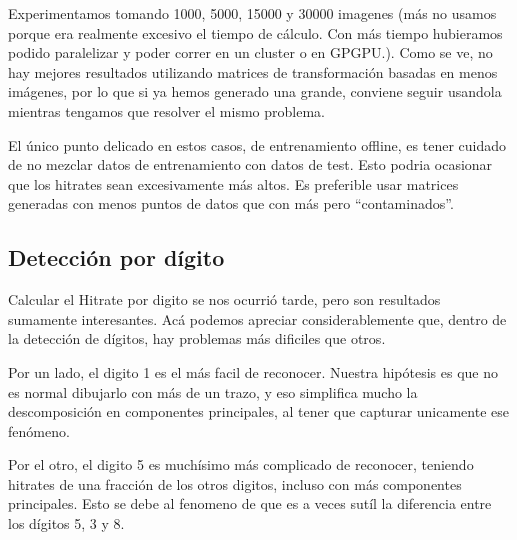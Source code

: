 Experimentamos tomando 1000, 5000, 15000 y 30000 imagenes (m\'as no usamos porque era
realmente excesivo el tiempo de c\'alculo. Con m\'as tiempo hubieramos podido paralelizar
y poder correr en un cluster o en GPGPU.). Como se ve, no hay mejores resultados
utilizando matrices de transformaci\'on basadas en menos im\'agenes, por lo que
si ya hemos generado una grande, conviene seguir usandola mientras tengamos que resolver
el mismo problema.

El \'unico punto delicado en estos casos, de entrenamiento offline, es tener cuidado
de no mezclar datos de entrenamiento con datos de test. Esto podria ocasionar que
los hitrates sean excesivamente m\'as altos. Es preferible usar matrices generadas
con menos puntos de datos que con m\'as pero ``contaminados''.



\subsection{Detecci\'on por d\'igito}
Calcular el Hitrate por digito se nos ocurri\'o tarde, pero son resultados
sumamente interesantes. Ac\'a podemos apreciar considerablemente que, dentro de
la detecci\'on de d\'igitos, hay problemas m\'as dificiles que otros.

Por un lado, el digito 1 es el m\'as facil de reconocer. Nuestra hip\'otesis
es que no es normal dibujarlo con m\'as de un trazo, y eso simplifica mucho la
descomposici\'on en componentes principales, al tener que capturar unicamente ese
fen\'omeno.

Por el otro, el digito 5 es much\'isimo m\'as complicado de reconocer, teniendo
hitrates de una fracci\'on de los otros digitos, incluso con m\'as componentes
principales. Esto se debe al fenomeno de que es a veces sut\'il la diferencia
entre los d\'igitos 5, 3 y 8.


